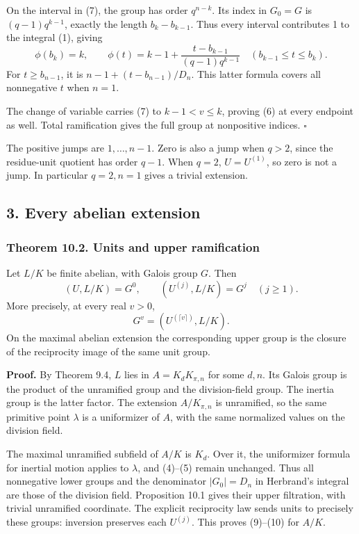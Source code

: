 \documentclass[11pt,a4paper]{article}
\begin{document}
On the interval in (7), the group has order \(q^{n-k}\). Its index in
\(G_0=G\) is \((q-1)q^{k-1}\), exactly the length \(b_k-b_{k-1}\). Thus
every interval contributes 1 to the integral (1), giving \[
\phi(b_k)=k,\qquad
\phi(t)=k-1+\frac{t-b_{k-1}}{(q-1)q^{k-1}}
\quad(b_{k-1}\leq t\leq b_k).
\tag{8}
\] For \(t\geq b_{n-1}\), it is \(n-1+(t-b_{n-1})/D_n\). This latter
formula covers all nonnegative \(t\) when \(n=1\).

The change of variable carries (7) to \(k-1<v\leq k\), proving (6) at
every endpoint as well. Total ramification gives the full group at
nonpositive indices. \(\square\)

The positive jumps are \(1,\ldots,n-1\). Zero is also a jump when
\(q>2\), since the residue-unit quotient has order \(q-1\). When
\(q=2\), \(U=U^{(1)}\), so zero is not a jump. In particular \(q=2,n=1\)
gives a trivial extension.

\subsection{3. Every abelian extension}\label{every-abelian-extension}

\subsubsection{Theorem 10.2. Units and upper
ramification}\label{theorem-10.2.-units-and-upper-ramification}

Let \(L/K\) be finite abelian, with Galois group \(G\). Then \[
(U,L/K)=G^0,\qquad
(U^{(j)},L/K)=G^j\quad(j\geq1).
\tag{9}
\] More precisely, at every real \(v>0\), \[
G^v=(U^{(\lceil v\rceil)},L/K).
\tag{10}
\] On the maximal abelian extension the corresponding upper group is the
closure of the reciprocity image of the same unit group.

\textbf{Proof.} By Theorem 9.4, \(L\) lies in \(A=K_dK_{\pi,n}\) for
some \(d,n\). Its Galois group is the product of the unramified group
and the division-field group. The inertia group is the latter factor.
The extension \(A/K_{\pi,n}\) is unramified, so the same primitive point
\(\lambda\) is a uniformizer of \(A\), with the same normalized values
on the division field.

The maximal unramified subfield of \(A/K\) is \(K_d\). Over it, the
uniformizer formula for inertial motion applies to \(\lambda\), and
(4)--(5) remain unchanged. Thus all nonnegative lower groups and the
denominator \(|G_0|=D_n\) in Herbrand's integral are those of the
division field. Proposition 10.1 gives their upper filtration, with
trivial unramified coordinate. The explicit reciprocity law sends units
to precisely these groups: inversion preserves each \(U^{(j)}\). This
proves (9)--(10) for \(A/K\).
\end{document}
